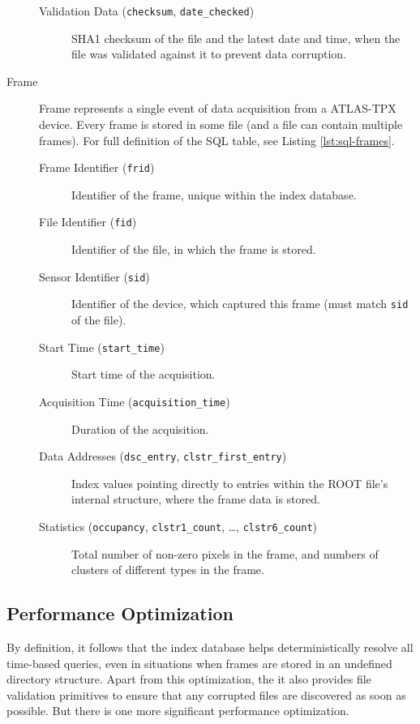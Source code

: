 \begin{description}
\begin{description}
		\item[Validation Data (\texttt{checksum}, \texttt{date\_checked})]
		SHA1 checksum of the file and the latest date and time, when the file was validated against it to prevent data corruption.
	\end{description}

	\item[Frame]
	Frame represents a single event of data acquisition from a ATLAS-TPX device. Every frame is stored in some file (and a file can contain multiple frames). For full definition of the SQL table, see Listing \ref{lst:sql-frames}.

	\begin{description}
		\item[Frame Identifier (\texttt{frid})] 
		Identifier of the frame, unique within the index database.

		\item[File Identifier (\texttt{fid})]
		Identifier of the file, in which the frame is stored.

		\item[Sensor Identifier (\texttt{sid})] 
		Identifier of the device, which captured this frame (must match \texttt{sid} of the file).

		\item[Start Time (\texttt{start\_time})] 
		Start time of the acquisition.

		\item[Acquisition Time (\texttt{acquisition\_time})] 
		Duration of the acquisition.

		\item[Data Addresses (\texttt{dsc\_entry}, \texttt{clstr\_first\_entry})]
		Index values pointing directly to entries within the ROOT file's internal structure, where the frame data is stored.

		\item[Statistics (\texttt{occupancy}, \texttt{clstr1\_count}, \dots, \texttt{clstr6\_count})]
		Total number of non-zero pixels in the frame, and numbers of clusters of different types in the frame.
	\end{description}
\end{description}

\subsection{Performance Optimization}
\label{db:performance-optimization}
By definition, it follows that the index database helps deterministically resolve all time-based queries, even in situations when frames are stored in an undefined directory structure. Apart from this optimization, the it also provides file validation primitives to ensure that any corrupted files are discovered as soon as possible. But there is one more significant performance optimization.

